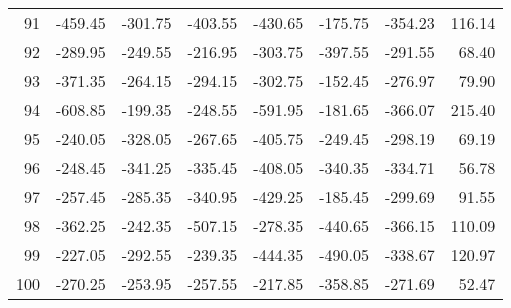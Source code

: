 \begin{longtable}{rrrrrrrr}
91 & -459.45 & -301.75 & -403.55 & -430.65 & -175.75 & -354.23 & 116.14  \\
92 & -289.95 & -249.55 & -216.95 & -303.75 & -397.55 & -291.55 & 68.40  \\
93 & -371.35 & -264.15 & -294.15 & -302.75 & -152.45 & -276.97 & 79.90  \\
94 & -608.85 & -199.35 & -248.55 & -591.95 & -181.65 & -366.07 & 215.40  \\
95 & -240.05 & -328.05 & -267.65 & -405.75 & -249.45 & -298.19 & 69.19  \\
96 & -248.45 & -341.25 & -335.45 & -408.05 & -340.35 & -334.71 & 56.78  \\
97 & -257.45 & -285.35 & -340.95 & -429.25 & -185.45 & -299.69 & 91.55  \\
98 & -362.25 & -242.35 & -507.15 & -278.35 & -440.65 & -366.15 & 110.09  \\
99 & -227.05 & -292.55 & -239.35 & -444.35 & -490.05 & -338.67 & 120.97  \\
100 & -270.25 & -253.95 & -257.55 & -217.85 & -358.85 & -271.69 & 52.47  \\

\end{longtable}


